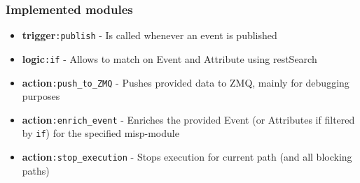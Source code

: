 \begin{frame}
    \frametitle{Implemented modules}
    \begin{itemize}
        \item \textbf{trigger}\texttt{:publish} - Is called whenever an event is published
        \item \textbf{logic}\texttt{:if} - Allows to match on Event and Attribute using restSearch
        \item \textbf{action}\texttt{:push\_to\_ZMQ} - Pushes provided data to ZMQ, mainly for debugging purposes
        \item \textbf{action}\texttt{:enrich\_event} - Enriches the provided Event (or Attributes if filtered by \texttt{if}) for the specified misp-module
        \item \textbf{action}\texttt{:stop\_execution} - Stops execution for current path (and all blocking paths)
    \end{itemize}
\end{frame}

